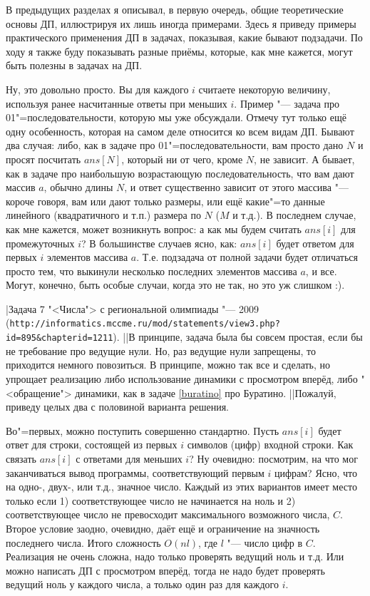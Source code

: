 В предыдущих разделах я описывал, в первую очередь, общие теоретические основы ДП, иллюстрируя их 
лишь иногда примерами. Здесь я приведу примеры практического применения ДП в задачах, показывая, 
какие бывают подзадачи. По ходу я также буду показывать разные приёмы, которые, как мне кажется, 
могут быть полезны в задачах на ДП.

 Ну, это довольно просто. Вы для каждого $i$ считаете некоторую величину, 
используя ранее насчитанные ответы при меньших $i$. Пример "--- задача про 01"=последовательности, 
которую мы уже обсуждали. Отмечу тут только ещё одну особенность, которая на самом деле относится 
ко всем видам ДП. Бывают два случая: либо, как в задаче про 01"=последовательности, вам просто дано
$N$ и просят посчитать $ans[N]$, который ни от чего, кроме $N$, не зависит. А бывает, как в задаче про 
наибольшую возрастающую последовательность, что вам дают массив $a$, обычно длины $N$, и ответ 
существенно зависит от этого массива "--- короче говоря, вам или дают только размеры, или ещё 
какие"=то данные линейного (квадратичного и т.п.) размера по $N$ ($M$ и т.д.). В последнем случае, 
как мне кажется, может возникнуть вопрос: а как мы будем считать $ans[i]$ для промежуточных $i$? 
В большинстве случаев ясно, как: $ans[i]$ будет ответом для первых $i$ элементов массива $a$. Т.е. 
подзадача от полной задачи будет отличаться просто тем, что выкинули несколько последних элементов 
массива $a$, и все. {\small Могут, конечно, быть особые случаи, когда это не так, но это уж слишком 
:).}

\task|Задача 7 "<Числа"> с региональной олимпиады "--- 2009 \\
(\/\verb`http://informatics.mccme.ru/mod/statements/view3.php?id=895&chapterid=1211`).
||В принципе, задача была бы совсем простая, если бы не требование про ведущие нули. Но, раз 
ведущие нули запрещены, то приходится немного повозиться. В принципе, можно так все и сделать, но 
упрощает реализацию либо использование динамики с просмотром вперёд, либо "<обращение"> динамики, 
как в задаче \ref{buratino} про Буратино.
||Пожалуй, приведу целых два с половиной варианта решения.

Во"=первых, можно поступить совершенно стандартно. Пусть $ans[i]$ будет ответ для строки, состоящей 
из первых $i$ символов (цифр) входной строки. Как связать $ans[i]$ с ответами для меньших $i$? Ну 
очевидно: посмотрим, на что мог заканчиваться вывод программы, соответствующий первым $i$ цифрам? 
Ясно, что на одно-, двух-, или т.д., значное число. Каждый из этих вариантов имеет место только 
если 1) соответствующее число не начинается на ноль и 2) соответствующее число не превосходит 
максимального возможного числа, $C$. Второе условие заодно, очевидно, даёт ещё и ограничение на 
значность последнего числа. Итого сложность $O(nl)$, где $l$ "--- число цифр в $C$. Реализация не 
очень сложна, надо только проверять ведущий ноль и т.д. Или можно написать ДП с просмотром вперёд, 
тогда не надо будет проверять ведущий ноль у каждого числа, а только один раз для каждого $i$.

